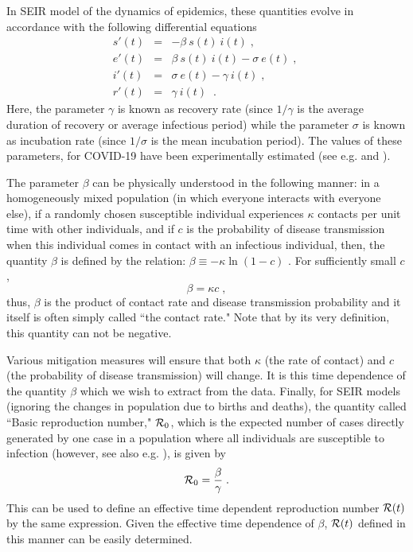 \documentclass[aps,prd,10pt,twocolumn,nofootinbib]{revtex4-2}
\begin{document}
In SEIR model \cite{Book_2008,Book_2018}
of the dynamics of epidemics, these quantities evolve in accordance with the following differential equations
 \begin{eqnarray}
 s'(t) & = & - \beta~ s(t)~  i(t) \; , \label{eq:s-smooth}\; \\
 e'(t) & = & \beta~ s(t)~  i(t) - \sigma~ e(t) \; ,  \label{eq:e-smooth}\; \\
 i'(t)  & = & \sigma~ e(t) - \gamma~ i(t) \; , \label{eq:i-smooth}\; \\
 r'(t) & = &  \gamma~ i(t) \label{eq:r-smooth}\; \; .
 \end{eqnarray}
Here, the parameter $\gamma$ is known as recovery rate (since $1/\gamma$ is the average duration of recovery or average infectious period) while the parameter $\sigma$ is known as incubation rate (since $1/\sigma$ is the mean incubation period). 
The values of these parameters, for COVID-19 have been experimentally estimated (see e.g. \cite{params} and \cite{jcm9040967}).

The parameter $\beta$ can be physically understood in the following manner:
in a homogeneously mixed population (in which everyone interacts with everyone else), if a randomly chosen susceptible individual experiences $\kappa$ contacts per unit time with other individuals, and if $c$ is the probability of disease transmission when this individual comes in contact with an infectious individual, then, the quantity $\beta$ is defined by the relation: $\beta \equiv - \kappa \ln (1-c)$ \cite{Book_2008}. For sufficiently small $c$, 
\begin{equation}
 \beta = \kappa c \; ,
\end{equation}
thus, $\beta$ is the product of contact rate and disease transmission probability and it itself is often simply called ``the contact rate."
Note that by its very definition, this quantity can not be negative.

Various mitigation measures will ensure that both $\kappa$ (the rate of contact) and $c$ (the probability of disease transmission) will change. It is this time dependence of the quantity $\beta$ which we wish to extract from the data.
Finally, for SEIR models (ignoring the changes in population due to births and deaths), the quantity  called ``Basic reproduction number," ${\cal R}_0$, which is
the expected number of cases directly generated by one case in a population where all individuals are susceptible to infection (however, see also e.g. \cite{ComplexityR0}), is given by
\begin{equation} \label{eq:R0}
{\cal R}_0 = \frac{\beta}{\gamma} \; .
\end{equation}
This can be used to define an effective time dependent reproduction number ${\cal R} (t)$ by the same expression. Given the effective time dependence of $\beta$, ${\cal R} (t)$ defined in this manner can be easily determined.
\end{document}
